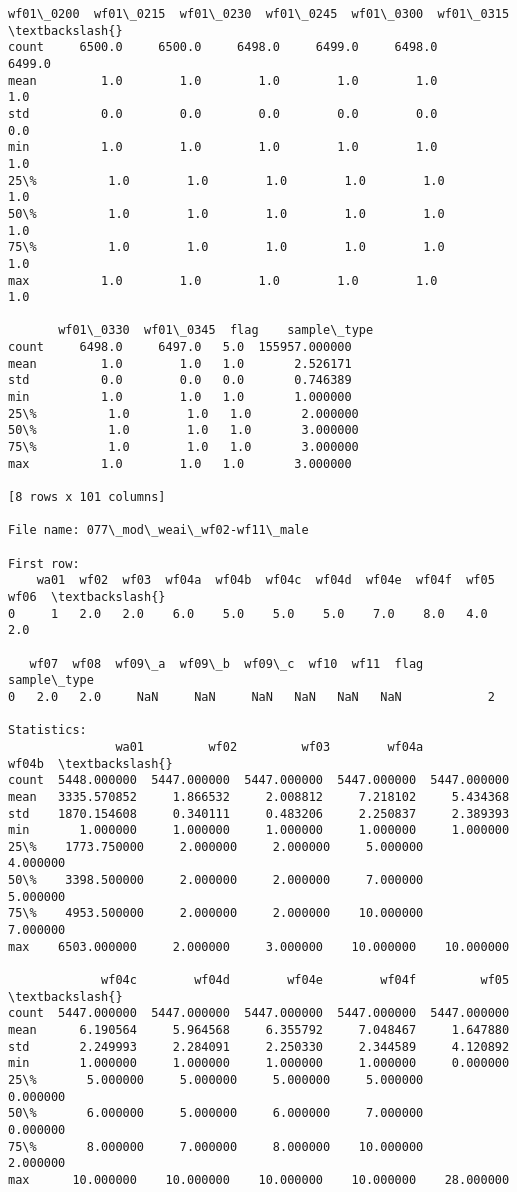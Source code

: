 \documentclass[11pt]{article}
\begin{document}
\begin{Verbatim}[commandchars=\\\{\}]
       wf01\_0200  wf01\_0215  wf01\_0230  wf01\_0245  wf01\_0300  wf01\_0315  \textbackslash{}
count     6500.0     6500.0     6498.0     6499.0     6498.0     6499.0   
mean         1.0        1.0        1.0        1.0        1.0        1.0   
std          0.0        0.0        0.0        0.0        0.0        0.0   
min          1.0        1.0        1.0        1.0        1.0        1.0   
25\%          1.0        1.0        1.0        1.0        1.0        1.0   
50\%          1.0        1.0        1.0        1.0        1.0        1.0   
75\%          1.0        1.0        1.0        1.0        1.0        1.0   
max          1.0        1.0        1.0        1.0        1.0        1.0   

       wf01\_0330  wf01\_0345  flag    sample\_type  
count     6498.0     6497.0   5.0  155957.000000  
mean         1.0        1.0   1.0       2.526171  
std          0.0        0.0   0.0       0.746389  
min          1.0        1.0   1.0       1.000000  
25\%          1.0        1.0   1.0       2.000000  
50\%          1.0        1.0   1.0       3.000000  
75\%          1.0        1.0   1.0       3.000000  
max          1.0        1.0   1.0       3.000000  

[8 rows x 101 columns]

File name: 077\_mod\_weai\_wf02-wf11\_male

First row: 
    wa01  wf02  wf03  wf04a  wf04b  wf04c  wf04d  wf04e  wf04f  wf05  wf06  \textbackslash{}
0     1   2.0   2.0    6.0    5.0    5.0    5.0    7.0    8.0   4.0   2.0   

   wf07  wf08  wf09\_a  wf09\_b  wf09\_c  wf10  wf11  flag  sample\_type  
0   2.0   2.0     NaN     NaN     NaN   NaN   NaN   NaN            2  

Statistics: 
               wa01         wf02         wf03        wf04a        wf04b  \textbackslash{}
count  5448.000000  5447.000000  5447.000000  5447.000000  5447.000000   
mean   3335.570852     1.866532     2.008812     7.218102     5.434368   
std    1870.154608     0.340111     0.483206     2.250837     2.389393   
min       1.000000     1.000000     1.000000     1.000000     1.000000   
25\%    1773.750000     2.000000     2.000000     5.000000     4.000000   
50\%    3398.500000     2.000000     2.000000     7.000000     5.000000   
75\%    4953.500000     2.000000     2.000000    10.000000     7.000000   
max    6503.000000     2.000000     3.000000    10.000000    10.000000   

             wf04c        wf04d        wf04e        wf04f         wf05  \textbackslash{}
count  5447.000000  5447.000000  5447.000000  5447.000000  5447.000000   
mean      6.190564     5.964568     6.355792     7.048467     1.647880   
std       2.249993     2.284091     2.250330     2.344589     4.120892   
min       1.000000     1.000000     1.000000     1.000000     0.000000   
25\%       5.000000     5.000000     5.000000     5.000000     0.000000   
50\%       6.000000     5.000000     6.000000     7.000000     0.000000   
75\%       8.000000     7.000000     8.000000    10.000000     2.000000   
max      10.000000    10.000000    10.000000    10.000000    28.000000   


\end{Verbatim}
\end{document}
